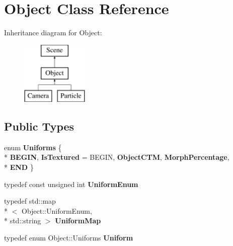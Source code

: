 \hypertarget{class_object}{\section{Object Class Reference}
\label{class_object}
}
Inheritance diagram for Object\-:\begin{figure}[H]
\begin{center}
\leavevmode
\includegraphics[height=3.000000cm]{class_object}
\end{center}
\end{figure}
\subsection*{Public Types}
\begin{DoxyCompactItemize}
\item 
enum {\bfseries Uniforms} \{ \\*
{\bfseries B\-E\-G\-I\-N}, 
{\bfseries Is\-Textured} = B\-E\-G\-I\-N, 
{\bfseries Object\-C\-T\-M}, 
{\bfseries Morph\-Percentage}, 
\\*
{\bfseries E\-N\-D}
 \}
\item 
\hypertarget{class_object_a79b74057dbc5182b85c9c3ba8480fcf2}{typedef const unsigned int {\bfseries Uniform\-Enum}}\label{class_object_a79b74057dbc5182b85c9c3ba8480fcf2}

\item 
\hypertarget{class_object_a6e19bd8516360bff956408cbae33b878}{typedef std\-::map\\*
$<$ Object\-::\-Uniform\-Enum, \\*
std\-::string $>$ {\bfseries Uniform\-Map}}\label{class_object_a6e19bd8516360bff956408cbae33b878}

\item 
\hypertarget{class_object_ae6a2969ddca87d2c54b7cb1c131a7d60}{typedef enum Object\-::\-Uniforms {\bfseries Uniform}}\label{class_object_ae6a2969ddca87d2c54b7cb1c131a7d60}

\end{DoxyCompactItemize}
